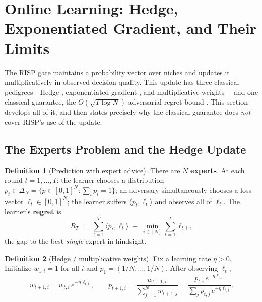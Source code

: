 \documentclass[11pt,a4paper]{article}
\theoremstyle{definition}
\newtheorem{definition}{Definition}[section]
\theoremstyle{plain}
\newcommand{\nm}{\textsc{RISP}}
\begin{document}
\section{Online Learning: Hedge, Exponentiated Gradient, and Their Limits}
\label{sec:dd1-online}

The \nm{} gate maintains a probability vector over niches and updates it
multiplicatively in observed decision quality. This update has three classical
pedigrees---Hedge \cite{freund1997decision}, exponentiated gradient
\cite{kivinen1997exponentiated}, and multiplicative weights
\cite{arora2012multiplicative}---and one classical guarantee, the
$O(\sqrt{T \log N})$ adversarial regret bound \cite{cesa2006prediction}. This
section develops all of it, and then states precisely why the classical
guarantee does \emph{not} cover \nm{}'s use of the update.

\subsection{The Experts Problem and the Hedge Update}

\begin{definition}[Prediction with expert advice]
\label{def:dd1-experts}
There are $N$ \textbf{experts}. At each round $t = 1, \dots, T$: the learner
chooses a distribution $p_t \in \Delta_N = \{p \in [0,1]^N : \sum_i p_i =
1\}$; an adversary simultaneously chooses a loss vector
$\ell_t \in [0, 1]^N$; the learner suffers $\langle p_t, \ell_t \rangle$ and
observes all of $\ell_t$. The learner's \textbf{regret} is
\begin{equation}
\label{eq:dd1-experts-regret}
R_T \;=\; \sum_{t=1}^T \langle p_t, \ell_t \rangle
\;-\; \min_{i \in [N]} \sum_{t=1}^T \ell_{t,i},
\end{equation}
the gap to the best \emph{single} expert in hindsight.
\end{definition}

\begin{definition}[Hedge / multiplicative weights]
\label{def:dd1-hedge}
Fix a learning rate $\eta > 0$. Initialize $w_{1,i} = 1$ for all $i$ and
$p_1 = (1/N, \dots, 1/N)$. After observing $\ell_t$,
\begin{equation}
\label{eq:dd1-hedge}
w_{t+1, i} = w_{t, i}\, e^{-\eta\, \ell_{t,i}},
\qquad
p_{t+1, i} = \frac{w_{t+1, i}}{\sum_{j=1}^N w_{t+1, j}}
= \frac{p_{t,i}\, e^{-\eta \ell_{t,i}}}{\sum_j p_{t,j}\, e^{-\eta
\ell_{t,j}}}.
\end{equation}
\end{definition}
\end{document}
